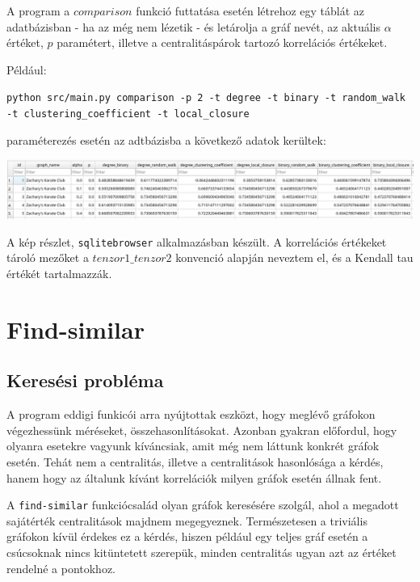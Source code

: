 \documentclass[12pt,numbers=noenddot]{report}
\begin{document}
A program a $comparison$ funkció futtatása esetén létrehoz egy táblát az 
adatbázisban - ha az még nem lézetik - és letárolja a gráf nevét, az aktuális 
$\alpha$ értéket, $p$ paramétert, illetve a centralitáspárok tartozó korrelációs
értékeket.

\vspace{0.3cm}

\noindent
Például:

\texttt{python src/main.py comparison -p 2 -t degree -t binary -t random\_walk 
-t clustering\_coefficient -t local\_closure}

\noindent
paraméterezés esetén az adtbázisba a következő adatok kerültek:

\vspace{0.3cm}

\noindent
\includegraphics[width=\linewidth]{images/comparison_result.png}

\noindent
A kép részlet, \texttt{sqlitebrowser} alkalmazásban készült.
A korrelációs értékeket tároló mezőket a $tenzor1\_tenzor2$ konvenció alapján 
neveztem el, és a Kendall tau értékét tartalmazzák.

\pagebreak

\section{Find-similar}

\subsection{Keresési probléma}

A program eddigi funkicói arra nyújtottak eszközt, hogy meglévő gráfokon 
végezhessünk méréseket, összehasonlításokat. Azonban gyakran előfordul, hogy
olyanra esetekre vagyunk kíváncsiak, amit még nem láttunk konkrét gráfok esetén.
Tehát nem a centralitás, illetve a centralitások hasonlósága a kérdés, hanem
hogy az általunk kívánt korrelációk milyen gráfok esetén állnak fent.

A \texttt{find-similar} funkciócsalád olyan gráfok keresésére szolgál, ahol
a megadott sajátérték centralitások majdnem megegyeznek. Természetesen a 
triviális gráfokon kívül érdekes ez a kérdés, hiszen például egy teljes gráf
esetén a csúcsoknak nincs kitüntetett szerepük, minden centralitás ugyan azt 
az értéket rendelné a pontokhoz.
\end{document}
